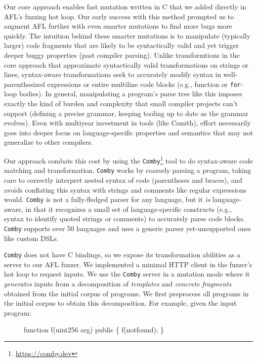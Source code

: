 Our core approach enables fast mutation written in C that we added directly in
AFL's fuzzing hot loop. Our early success with this method prompted us to
augment AFL further with even smarter mutations to find more bugs more quickly.
The intuition behind these smarter mutations is to manipulate (typically
larger) code fragments that are likely to be syntactically valid and yet
trigger deeper buggy properties (past compiler parsing). Unlike transformtions
in the core approach that approximate syntactically valid transformations on
strings or lines, syntax-aware transformations seek to accurately modify syntax
in well-parenthesized expressions or entire multiline code blocks (e.g.,
function or \texttt{for}-loop bodies). In general, manipulating a program's
parse tree like this imposes exactly the kind of burden and complexity that
small compiler projects can't support (defining a precise grammar, keeping
tooling up to date as the grammar evolves). Even with multiyear investment in
tools (like Csmith), effort necessarily goes into deeper focus on
language-specific properties and semantics %
that may not generalize to other compilers.

Our approach combats this cost by using the
\texttt{Comby}\footnote{\href{https://comby.dev}{https://comby.dev}} tool to do
syntax-aware code matching and transformation. \texttt{Comby} works by coarsely
parsing a program, taking care to correctly interpret nested syntax of code
(parentheses and braces), and avoids conflating this syntax with strings and
comments like regular expressions would.  \texttt{Comby} is not a fully-fledged
parser for any language, but it \emph{is} language-aware, in that it recognizes
a small set of language-specific constructs (e.g., syntax to identify quoted
strings or comments) to accurately parse code blocks. \texttt{Comby} supports
over 50 languages and uses a generic parser yet-unsupported ones like custom
DSLs.

\texttt{Comby} does not have C bindings, so we expose its transformation
abilities as a server to our AFL fuzzer. We implemented a minimal HTTP client
in the fuzzer's hot loop to request inputs. We use the \texttt{Comby} server in
a mutation mode where it \emph{generates} inputs from a decomposition of
\emph{templates} and \emph{concrete fragments} obtained from the initial corpus
of programs. We first preprocess all programs in the initial corpus to obtain
this decomposition. For example, given the input program:

\begin{figure}[ht!]
\begin{code}
function f(uint256 arg) public \{
    f(notfound);
\}
\end{code}
\end{figure}


